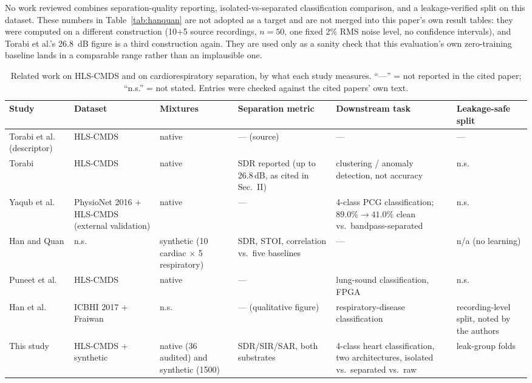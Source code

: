 \documentclass[journal]{IEEEtran}
\begin{document}
No work reviewed combines separation-quality reporting, isolated-vs-separated classification comparison, and a leakage-verified split on this dataset. These numbers in Table~\ref{tab:hanquan} are not adopted as a target and are not merged into this paper's own result tables: they were computed on a different construction (10+5 source recordings, $n=50$, one fixed 2\% RMS noise level, no confidence intervals), and Torabi et al.'s 26.8~dB figure is a third construction again. They are used only as a sanity check that this evaluation's own zero-training baseline lands in a comparable range rather than an implausible one.


\begin{table}[t]
\centering
\caption{Related work on HLS-CMDS and on cardiorespiratory separation, by what each study measures. ``---'' = not reported in the cited paper; ``n.s.'' = not stated. Entries were checked against the cited papers' own text.}
\label{pi:related}
\scriptsize\setlength{\tabcolsep}{3pt}
\begin{tabular}{@{}p{3.6cm}p{2.6cm}p{1.9cm}p{2.9cm}p{3.3cm}p{2.2cm}@{}}
\toprule
Study & Dataset & Mixtures & Separation metric & Downstream task & Leakage-safe split \\
\midrule
Torabi et al.\ \cite{torabi_descriptor} (descriptor) & HLS-CMDS & native & --- (source) & --- & --- \\
Torabi \cite{torabi_diss} & HLS-CMDS & native & SDR reported (up to 26.8\,dB, as cited in Sec.~II) & clustering / anomaly detection, not accuracy & n.s. \\
Yaqub et al.\ \cite{yaqub2025} & PhysioNet 2016 + HLS-CMDS (external validation) & native & --- & 4-class PCG classification; $89.0\%\to41.0\%$ clean vs.\ bandpass-separated & n.s. \\
Han and Quan \cite{han_quan_ssa} & n.s. & synthetic (10 cardiac $\times$ 5 respiratory) & SDR, STOI, correlation vs.\ five baselines & --- & n/a (no learning) \\
Puneet et al.\ \cite{puneet2025} & HLS-CMDS & native & --- & lung-sound classification, FPGA & n.s. \\
Han et al.\ \cite{han2026} & ICBHI 2017 + Fraiwan & n.s. & --- (qualitative figure) & respiratory-disease classification & recording-level split, noted by the authors \\
This study & HLS-CMDS + synthetic & native (36 audited) and synthetic (1500) & SDR/SIR/SAR, both substrates & 4-class heart classification, two architectures, isolated vs.\ separated vs.\ raw & leak-group folds \\
\bottomrule
\end{tabular}
\end{table}
\end{document}
